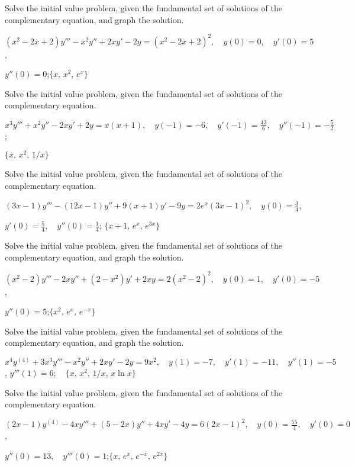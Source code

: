 \documentclass{ximera}
\begin{document}
\begin{problem}\label{exer:9.4.26} Solve the
initial value problem, given the fundamental set of solutions of the complementary equation, and graph the solution.

$(x^2-2x+2)y'''-x^2y''+2xy'-2y=(x^2-2x+2)^2, \quad  y(0)=0,\quad y'(0)=5$,

$y''(0)=0$;\quad       $\{x,\,x^2,\,e^x\}$
\end{problem}

\begin{problem}\label{exer:9.4.27}
Solve the
initial value problem, given the fundamental set of solutions of the complementary equation.

$x^3y'''+x^2y''-2xy'+2y=x(x+1), \quad  y(-1)=-6,\quad y'(-1)=\frac{43}{6},\quad y''(-1)=
-\frac{5}{2}$;\quad

  $\{x,\,x^2,\,1/x\}$
\end{problem}

\begin{problem}\label{exer:9.4.28}
Solve the
initial value problem, given the fundamental set of solutions of the complementary equation.

$(3x-1)y'''-(12x-1)y''+9(x+1)y'-9y=2e^x(3x-1)^2, \quad  y(0)=\frac{3}{4}$,

$y'(0)=\frac{5}{4}, \quad  y''(0)=\frac{1}{4}$;\quad
$\{x+1,\,e^x,\,e^{3x}\}$
\end{problem}

\begin{problem}\label{exer:9.4.29}  Solve the
initial value problem, given the fundamental set of solutions of the complementary equation, and graph the solution.

$(x^2-2)y'''-2xy''+(2-x^2)y'+2xy=2(x^2-2)^2, \quad  y(0)=1,\quad y'(0)=-5$,

 $y''(0)=5$;\quad      $\{x^2,\,e^x,\,e^{-x}\}$
\end{problem}


\begin{problem}\label{exer:9.4.30} Solve the
initial value problem, given the fundamental set of solutions of the complementary equation, and graph the solution.

$x^4y^{(4)}+3x^3y'''-x^2y''+2xy'-2y=9x^2, \quad  y(1)=-7,\quad y'(1)=
-11,\quad y''(1)=-5$,\;
$y'''(1)=6; \quad \{x,\,x^2,\,1/x,\,x\ln x\}$
\end{problem}


\begin{problem}\label{exer:9.4.31}
Solve the
initial value problem, given the fundamental set of solutions of the complementary equation.

$(2x-1)y^{(4)}-4xy'''+(5-2x)y''+4xy'-4y=6(2x-1)^2, \quad  y(0)=\frac{55}{4},
\quad y'(0)=0$,

$y''(0)=13, \quad  y'''(0)=1$;\quad    $\{x,\,e^x,\,e^{-x},\,e^{2x}\}$
\end{problem}
\end{document}
